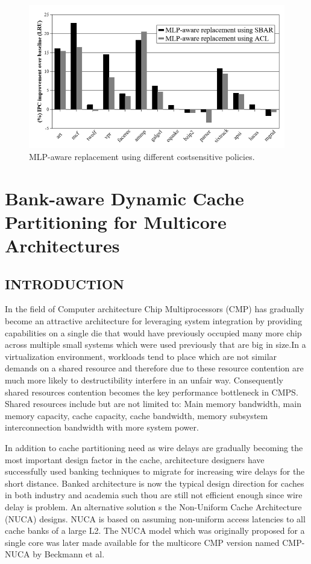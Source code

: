 \documentclass{report}
\begin{document}
\begin{figure}[h!]
\includegraphics[width=1\textwidth]{./fig17}
\caption{  MLP-aware replacement using different costsensitive policies.}
\label{fig17}
\end{figure}

\chapter{Bank-aware Dynamic Cache Partitioning for Multicore Architectures}
\section{ INTRODUCTION }
\vspace{.5cm}
In the field of Computer architecture Chip Multiprocessors (CMP) has gradually become an attractive architecture for leveraging system integration by providing capabilities on a single die that would have previously occupied many more chip across multiple small systems which were used previously that are big in size.In a virtualization environment, workloads tend to place which are not similar demands on a shared resource and therefore due to these resource contention are much more likely to destructibility interfere in an unfair way. Consequently shared resources contention becomes the key performance bottleneck in CMPS. Shared resources include but are not limited to: Main memory bandwidth, main memory capacity, cache capacity, cache bandwidth, memory subsystem interconnection bandwidth with more system power.\vspace{.5cm}


In addition to cache partitioning need as wire delays are gradually becoming the most important design factor in the cache, architecture designers have successfully used banking techniques to migrate for increasing wire delays for the short distance. Banked architecture is now the typical design direction for caches in both industry and academia such thou are still not efficient enough since wire delay is problem. An alternative solution s the Non-Uniform Cache Architecture (NUCA) designs. NUCA is based on assuming non-uniform access latencies to all cache banks of a large L2. The NUCA model which was originally proposed for a single core was later made available for the multicore CMP version named CMP-NUCA by Beckmann et al.
\end{document}

